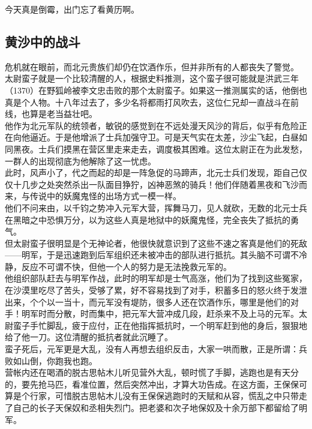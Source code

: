 \begin{multicols}{\theparacolNo}
今天真是倒霉，出门忘了看黄历啊。\\

\subsection{黄沙中的战斗}
危机就在眼前，而北元贵族们却仍在饮酒作乐，但并非所有的人都丧失了警觉。\\

太尉蛮子就是一个比较清醒的人，根据史料推测，这个蛮子很可能就是洪武三年（1370）在野狐岭被李文忠击败的那个太尉蛮子。如果这一推测属实的话，他倒也真是个人物。十八年过去了，多少名将都雨打风吹去，这位仁兄却一直战斗在前线，也算是老当益壮吧。\\

他作为北元军队的统领者，敏锐的感觉到在不远处漫天风沙的背后，似乎有危险正在向他逼近。于是他增派了士兵加强守卫。可是天气实在太差，沙尘飞起，白昼如同黑夜。士兵们摸黑在营区里走来走去，调度极其困难。这位太尉正在为此发愁，一群人的出现彻底为他解除了这一忧虑。\\

此时，风声小了，代之而起的却是一阵急促的马蹄声，北元士兵们发现，距自己仅仅十几步之处突然杀出一队面目狰狞，凶神恶煞的骑兵！他们伴随着黑夜和飞沙而来，与传说中的妖魔鬼怪的出场方式一模一样。\\

他们不问来由，以千钧之势冲入元军大营，挥舞马刀，见人就砍，无数的北元士兵在黑暗之中恐惧万分，以为这些人真是地狱中的妖魔鬼怪，完全丧失了抵抗的勇气。\\

但太尉蛮子很明显是个无神论者，他很快就意识到了这些不速之客真是他们的死敌——明军，于是迅速跑到后军组织还未被冲击的部队进行抵抗。其头脑不可谓不冷静，反应不可谓不快，但他一个人的努力是无法挽救元军的。\\

他组织部队赶去与明军作战，此时的明军却是士气高涨，他们为了找到这些冤家，在沙漠里吃尽了苦头，受够了累，好不容易找到了对手，积蓄多日的怒火终于发泄出来，个个以一当十，而元军没有堤防，很多人还在饮酒作乐，哪里是他们的对手！明军时而分散，时而集中，把元军大营冲成几段，赶杀来不及上马的元军。太尉蛮子手忙脚乱，疲于应付，正在他指挥抵抗时，一个明军赶到他的身后，狠狠地给了他一刀。这位清醒的抵抗者就此沉睡了。\\

蛮子死后，元军更是大乱，没有人再想去组织反击，大家一哄而散，正是所谓：兵败如山倒，你跑我也跑。\\

营帐内还在喝酒的脱古思帖木儿听见营外大乱，顿时慌了手脚，逃跑也是有天分的，要先抢马匹，看准位置，然后突然冲出，才算大功告成。在这方面，王保保可算是个行家，可惜脱古思帖木儿没有王保保逃跑时的天赋和从容，慌乱之中只带走了自己的长子天保奴和丞相失烈门。把老婆和次子地保奴及十余万部下都留给了明军。\\


\end{multicols}
